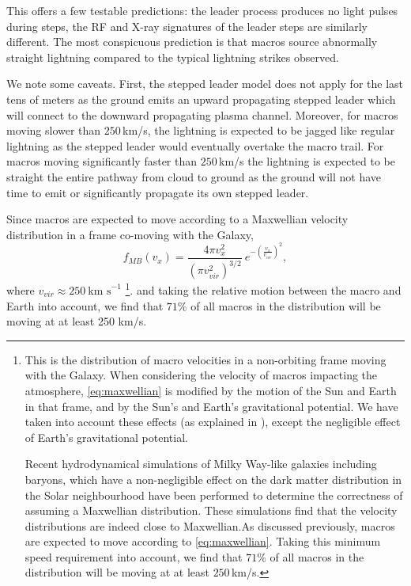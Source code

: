 \documentclass[%
 reprint,
 amsmath,amssymb,
 aps,
]{revtex4-2}
\begin{document}
        This offers a few testable predictions: the leader process produces no light pulses during steps, the RF and X-ray signatures of the leader steps are similarly different. The most conspicuous prediction is that {macros source abnormally straight lightning} compared to the typical lightning strikes observed.

        We note some caveats. First, the stepped leader model does not apply for the last tens of meters as the ground emits an upward propagating stepped leader which will connect to the downward propagating plasma channel. Moreover, for macros moving slower than $250\,$km/s, the lightning is expected to be jagged like regular lightning as the stepped leader would eventually overtake the macro trail. For macros moving significantly faster than $250\,$km/s the lightning is expected to be straight the entire pathway from cloud to ground as the ground will not have time to emit or significantly propagate its own stepped leader. 

        Since macros are expected to move according to a Maxwellian velocity distribution in a frame co-moving with the Galaxy,
        \begin{equation}\label{eq:maxwellian}
        	f_{MB}(v_x) = 
        		\frac{4\pi v_x^2}
        		{\left({\pi v_{vir}^2}\right)^{3/2}}~
        		e^{-\left(\frac{v_x}{v_{vir}}\right)^2}, 
        \end{equation}
        where $v_{vir} \approx 250~ \text{km s}^{-1}$ \footnote{
        	This is the distribution of macro velocities in a non-orbiting frame moving with the Galaxy. When considering the velocity of macros impacting the atmosphere, \eqref{eq:maxwellian} is modified by the motion of the Sun and Earth in that frame, and by the Sun's and Earth's gravitational potential. We have taken into account these effects (as explained  in \cite{Freese2013}), except the negligible effect of Earth's gravitational potential.

        	Recent hydrodynamical simulations of Milky Way-like galaxies including baryons, which have a non-negligible effect on the dark matter distribution in the Solar neighbourhood \cite{Tanabashi2018} have been performed to determine the correctness of assuming a Maxwellian distribution. These simulations find that the velocity distributions are indeed close to Maxwellian.As discussed previously, macros are expected to move according to \eqref{eq:maxwellian}. Taking this minimum speed requirement into account, we find that $71\%$ of all macros in the distribution will be moving at at least $250\,$km/s. 
    	}.
        and taking the relative motion between the macro and Earth into account, we find that $71\%$ of all macros in the distribution will be moving at at least 250 km/s.
\end{document}
